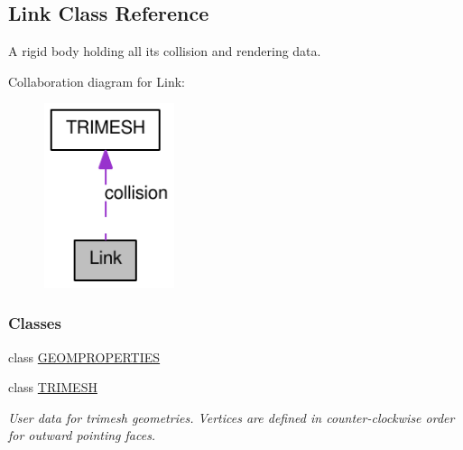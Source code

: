 \hypertarget{classOpenRAVE_1_1KinBody_1_1Link}{
\subsection{Link Class Reference}
\label{classOpenRAVE_1_1KinBody_1_1Link}
}


A rigid body holding all its collision and rendering data.  




Collaboration diagram for Link:\nopagebreak
\begin{figure}[H]
\begin{center}
\leavevmode
\includegraphics[width=108pt]{classOpenRAVE_1_1KinBody_1_1Link__coll__graph}
\end{center}
\end{figure}
\subsubsection*{Classes}
\begin{DoxyCompactItemize}
\item 
class \hyperlink{classOpenRAVE_1_1KinBody_1_1Link_1_1GEOMPROPERTIES}{GEOMPROPERTIES}
\item 
class \hyperlink{classOpenRAVE_1_1KinBody_1_1Link_1_1TRIMESH}{TRIMESH}
\begin{DoxyCompactList}\small\item\em User data for trimesh geometries. Vertices are defined in counter-\/clockwise order for outward pointing faces. \item\end{DoxyCompactList}\end{DoxyCompactItemize}
